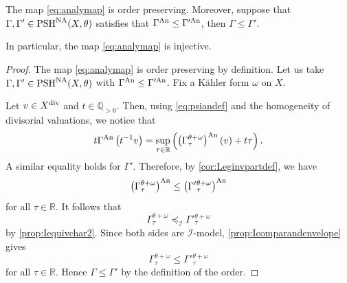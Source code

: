 \begin{lemma}\label{lma:anaorder}
    The map \eqref{eq:analymap} is order preserving. Moreover, suppose that $\Gamma,\Gamma'\in \mathrm{PSH}^{\mathrm{NA}}(X,\theta)$ satisfies that $\Gamma^{\mathrm{An}}\leq \Gamma'^{\mathrm{An}}$, then $\Gamma\leq \Gamma'$.

    In particular, the map \eqref{eq:analymap} is injective.
\end{lemma}
\begin{proof}
    The map \eqref{eq:analymap} is order preserving by definition. Let us take $\Gamma,\Gamma'\in \mathrm{PSH}^{\mathrm{NA}}(X,\theta)$ with $\Gamma^{\mathrm{An}}\leq \Gamma'^{\mathrm{An}}$. Fix a K\"ahler form $\omega$ on $X$.

    Let $v\in X^{\operatorname{div}}$ and $t \in \mathbb{Q}_{>0}$. Then, using \eqref{eq:psiandef} and the homogeneity of divisorial valuations, we notice that
\begin{equation}\label{eq:legendre_NA}
t \Gamma^{\mathrm{An}} \left(t^{-1} v \right) =  \sup_{\tau\in \mathbb{R}}\left( \left(\Gamma_{\tau}^{\theta+\omega}\right)^{\mathrm{An}}(v)+ t \tau\right).
\end{equation}
A similar equality holds for $\Gamma'$. Therefore, by \cref{cor:Leginvpartdef}, we have
\[
\left(\Gamma_{\tau}^{\theta+\omega}\right)^{\mathrm{An}}\leq \left(\Gamma'{}_{\tau}^{\theta+\omega}\right)^{\mathrm{An}}
\]
for all $\tau \in \mathbb{R}$. It follows that
\[
\Gamma_{\tau}^{\theta+\omega}\preceq_{\mathcal{I}} \Gamma'{}_{\tau}^{\theta+\omega}
\]
by \cref{prop:Iequivchar2}. Since both sides are $\mathcal{I}$-model, \cref{prop:Icomparandenvelope} gives
\[
\Gamma_{\tau}^{\theta+\omega}\leq \Gamma'{}_{\tau}^{\theta+\omega}
\]
for all $\tau\in \mathbb{R}$. Hence $\Gamma\leq \Gamma'$ by the definition of the order.
\end{proof}

